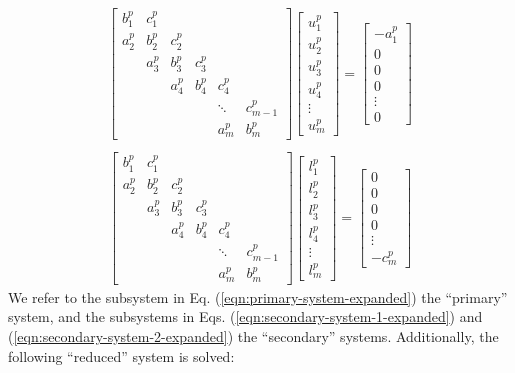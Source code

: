\documentclass{elsarticle}
\begin{document}
\begin{align}
& \begin{bmatrix}
b_1^p & c_1^p \\
a_2^p & b_2^p & c_2^p \\
      & a_3^p & b_3^p & c_3^p \\
      &       & a_4^p & b_4^p & c_4^p \\
      &       &       &       &  \ddots & c_{m-1}^p\\
      &       &       &       &     a_{m}^p  & b_{m}^p
\end{bmatrix}
\begin{bmatrix}
u_1^p \\
u_2^p \\
u_3^p \\
u_4^p \\
\vdots \\
u_m^p
\end{bmatrix}
=
\begin{bmatrix}
-a_1^p \\
0 \\
0 \\
0 \\
\vdots \\
0
\end{bmatrix} & \label{eqn:secondary-system-1-expanded} \\
\end{align}
%
\begin{align}
& \begin{bmatrix}
b_1^p & c_1^p \\
a_2^p & b_2^p & c_2^p \\
      & a_3^p & b_3^p & c_3^p \\
      &       & a_4^p & b_4^p & c_4^p \\
      &       &       &       &  \ddots & c_{m-1}^p\\
      &       &       &       &     a_{m}^p  & b_{m}^p
\end{bmatrix}
\begin{bmatrix}
l_1^p \\
l_2^p \\
l_3^p \\
l_4^p \\
\vdots \\
l_m^p
\end{bmatrix}
=
\begin{bmatrix}
0 \\
0 \\
0 \\
0 \\
\vdots \\
-c_m^p
\end{bmatrix} & \label{eqn:secondary-system-2-expanded}
\end{align}
%
We refer to the subsystem in Eq. (\ref{eqn:primary-system-expanded})
the ``primary'' system, and the subsystems in
Eqs. (\ref{eqn:secondary-system-1-expanded}) and
(\ref{eqn:secondary-system-2-expanded})
the ``secondary'' systems.
Additionally, the following ``reduced'' system is solved:
\end{document}
